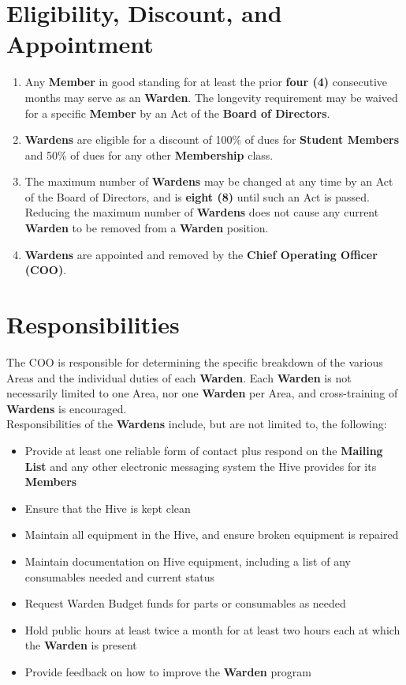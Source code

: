 \documentclass[11pt, oneside]{article}   	%
\begin{document}
\section{Eligibility, Discount, and Appointment}
\begin{enumerate}
\item Any \textbf{Member} in good standing for at least the prior \textbf{four (4)} consecutive months may serve as an \textbf{Warden}.
The longevity requirement may be waived for a specific \textbf{Member} by an Act of the \textbf{Board of Directors}.
\item \textbf{Wardens} are eligible for a discount of 100\% of dues for \textbf{Student Members} and 50\% of dues for any other \textbf{Membership} class.
\item The maximum number of \textbf{Wardens} may be changed at any time by an Act of the Board of Directors, and is \textbf{eight (8)} until such an Act is passed.
Reducing the maximum number of \textbf{Wardens} does not cause any current \textbf{Warden} to be removed from a \textbf{Warden} position.
\item \textbf{Wardens} are appointed and removed by the \textbf{Chief Operating Officer (COO)}.
\end{enumerate}

\section{Responsibilities}
The COO is responsible for determining the specific breakdown of the various Areas and the individual duties of each \textbf{Warden}.
Each \textbf{Warden} is not necessarily limited to one Area, nor one \textbf{Warden} per Area, and cross-training of \textbf{Wardens} is encouraged.\\
Responsibilities of the \textbf{Wardens} include, but are not limited to, the following:
\begin{itemize}[noitemsep]
\item Provide at least one reliable form of contact plus respond on the \textbf{Mailing List} and any other electronic messaging system the Hive provides for its \textbf{Members}
\item Ensure that the Hive is kept clean
\item Maintain all equipment in the Hive, and ensure broken equipment is repaired
\item Maintain documentation on Hive equipment, including a list of any consumables needed and current status
\item Request Warden Budget funds for parts or consumables as needed
\item Hold public hours at least twice a month for at least two hours each at which the \textbf{Warden} is present
\item Provide feedback on how to improve the \textbf{Warden} program
\end{itemize}
\end{document}
